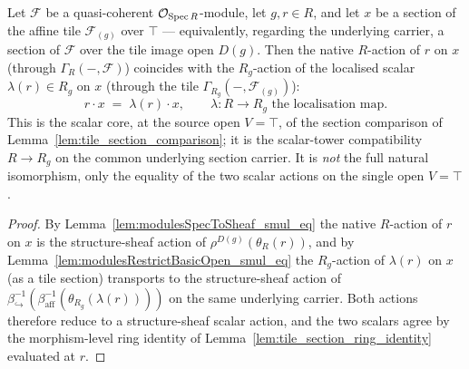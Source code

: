 \begin{lemma}\leanok
  \label{lem:tile_scalar_compat}
  Let \(\mathcal{F}\) be a quasi-coherent \(\mathcal{O}_{\operatorname{Spec} R}\)-module, let \(g, r \in R\), and let
  \(x\) be a section of the affine tile \(\mathcal{F}_{(g)}\) over \(\top\) --- equivalently, regarding
  the underlying carrier, a section of \(\mathcal{F}\) over the tile image open \(D(g)\). Then the native
  \(R\)-action of \(r\) on \(x\) (through \(\Gamma_R(-,\mathcal{F})\)) coincides with the \(R_g\)-action
  of the localised scalar \(\lambda(r) \in R_g\) on \(x\) (through the tile
  \(\Gamma_{R_g}(-, \mathcal{F}_{(g)})\)):
  \[
    r \cdot x \;=\; \lambda(r) \cdot x,
    \qquad \lambda : R \to R_g \text{ the localisation map}.
  \]
  This is the scalar core, at the source open \(V = \top\), of the section comparison of
  Lemma~\ref{lem:tile_section_comparison}; it is the scalar-tower compatibility \(R \to R_g\) on the
  common underlying section carrier. It is \emph{not} the full natural isomorphism, only the equality of
  the two scalar actions on the single open \(V = \top\).
\end{lemma}
\begin{proof}
    \leanok
  By Lemma~\ref{lem:modulesSpecToSheaf_smul_eq} the native \(R\)-action of \(r\) on \(x\) is the
  structure-sheaf action of \(\rho^{D(g)}(\theta_R(r))\), and by
  Lemma~\ref{lem:modulesRestrictBasicOpen_smul_eq} the \(R_g\)-action of \(\lambda(r)\) on \(x\) (as a
  tile section) transports to the structure-sheaf action of
  \(\beta_{\hookrightarrow}^{-1}(\beta_{\mathrm{aff}}^{-1}(\theta_{R_g}(\lambda(r))))\) on the same
  underlying carrier. Both actions therefore reduce to a structure-sheaf scalar action, and the two
  scalars agree by the morphism-level ring identity of Lemma~\ref{lem:tile_section_ring_identity}
  evaluated at \(r\).
\end{proof}

